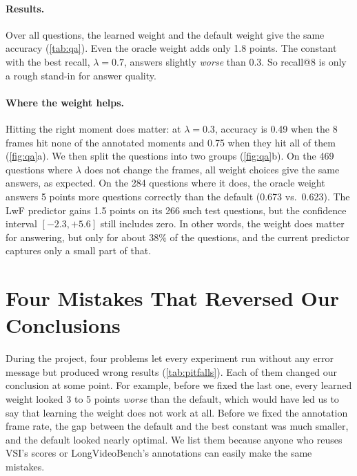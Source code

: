 \documentclass[10pt,twocolumn,letterpaper]{article}
\newcommand{\lam}{\lambda}
\begin{document}
\paragraph{Results.}
Over all questions, the learned weight and the default weight give the same accuracy (\cref{tab:qa}).
Even the oracle weight adds only 1.8 points.
The constant with the best recall, $\lam=0.7$, answers slightly \emph{worse} than 0.3.
So recall@8 is only a rough stand-in for answer quality.



\paragraph{Where the weight helps.}
Hitting the right moment does matter: at $\lam=0.3$, accuracy is 0.49 when the 8 frames hit none of the annotated moments and 0.75 when they hit all of them (\cref{fig:qa}a).
We then split the questions into two groups (\cref{fig:qa}b).
On the 469 questions where $\lam$ does not change the frames, all weight choices give the same answers, as expected.
On the 284 questions where it does, the oracle weight answers 5 points more questions correctly than the default (0.673 vs.\ 0.623).
The LwF predictor gains 1.5 points on its 266 such test questions, but the confidence interval $[-2.3, +5.6]$ still includes zero.
In other words, the weight does matter for answering, but only for about 38\% of the questions, and the current predictor captures only a small part of that.

\section{Four Mistakes That Reversed Our Conclusions}
\label{sec:pitfalls}

During the project, four problems let every experiment run without any error message but produced wrong results (\cref{tab:pitfalls}).
Each of them changed our conclusion at some point.
For example, before we fixed the last one, every learned weight looked 3 to 5 points \emph{worse} than the default, which would have led us to say that learning the weight does not work at all.
Before we fixed the annotation frame rate, the gap between the default and the best constant was much smaller, and the default looked nearly optimal.
We list them because anyone who reuses VSI's scores or LongVideoBench's annotations can easily make the same mistakes.
\end{document}
